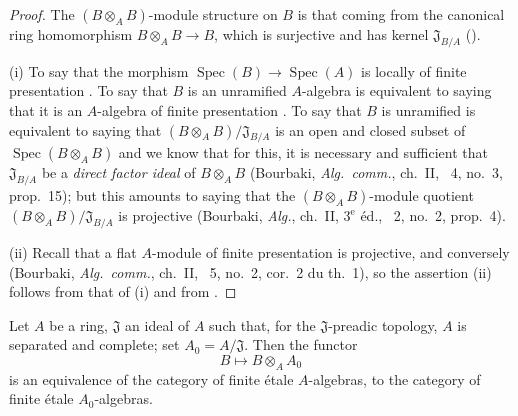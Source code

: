 \begin{proof}
The $(B\otimes_A B)$-module structure on $B$ is that coming from the canonical ring homomorphism $B\otimes_A B\to B$, which is surjective and has kernel $\mathfrak{J}_{B/A}$ ().

(i) To say that the morphism $\operatorname{Spec}(B)\to\operatorname{Spec}(A)$ is locally of finite presentation .
To say that $B$ is an unramified $A$-algebra is equivalent to saying that it is an $A$-algebra of finite presentation .
To say that $B$ is unramified is equivalent to saying that $(B\otimes_A B)/\mathfrak{J}_{B/A}$ is an open and closed subset of $\operatorname{Spec}(B\otimes_A B)$ and we know that for this, it is necessary and sufficient that $\mathfrak{J}_{B/A}$ be a \emph{direct factor ideal} of $B\otimes_A B$ (Bourbaki, \emph{Alg.\ comm.}, ch.~II, \textsection~4, no.~3, prop.~15);
but this amounts to saying that the $(B\otimes_A B)$-module quotient $(B\otimes_A B)/\mathfrak{J}_{B/A}$ is projective (Bourbaki, \emph{Alg.}, ch.~II, $3^{\text{e}}$ \'ed., \textsection~2, no.~2, prop.~4).

(ii) Recall that a flat $A$-module of finite presentation is projective, and conversely (Bourbaki, \emph{Alg.\ comm.}, ch.~II, \textsection~5, no.~2, cor.~2 du th.~1), so the assertion (ii) follows from that of (i) and from .
\end{proof}

\begin{proposition}[18.3.2]
\label{IV.18.3.2}
Let $A$ be a ring, $\mathfrak{J}$ an ideal of $A$ such that, for the $\mathfrak{J}$-preadic topology, $A$ is separated and complete;
set $A_0=A/\mathfrak{J}$.
Then the functor
\[
B\mapsto B\otimes_A A_0
\]
is an equivalence of the category of finite \'etale $A$-algebras, to the category of finite \'etale $A_0$-algebras.
\end{proposition}

